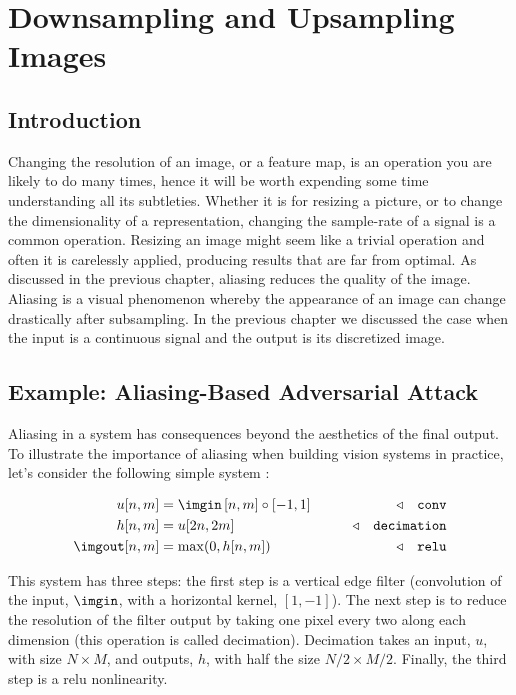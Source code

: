 \chapter{Downsampling and Upsampling Images}
\label{chap:downsampling_and_upsampling}

\newcommand{\imghidden}{\ell_{\texttt{hidden}}}


\section{Introduction}

Changing the resolution of an image, or a feature map, is an operation you are likely to do many times, hence it will be worth expending some time understanding all its subtleties. Whether it is for resizing a picture, or to change the dimensionality of a representation, changing the sample-rate of a signal is a common operation. Resizing an image might seem like a trivial operation and often it is carelessly applied, producing results that are far from optimal. As discussed in the previous chapter, aliasing reduces the quality of the image. Aliasing is a visual phenomenon whereby the appearance of an image can change drastically after subsampling. In the previous chapter we discussed the case when the input is a continuous signal and the output is its discretized image.  


\section{Example: Aliasing-Based Adversarial Attack}

Aliasing in a system has consequences beyond the aesthetics of the final output. To illustrate the importance of aliasing when building vision systems in practice, let's consider the following simple system \cite{rodríguezmuñoz2022aliasing}:

\begin{align}
    u[n,m] &= \imgin \left[n,m\right] \circ \left[-1, 1 \right]  & \quad\quad \triangleleft \quad \texttt{conv}\\
    h[n,m] &= u[2n,2m]  & \quad\quad \triangleleft \quad \texttt{decimation}\\
    \imgout[n,m] &= \max (0,h[n,m])  & \quad\quad \triangleleft \quad \texttt{relu}
\end{align}

This system has three steps: the first step is a vertical edge filter (convolution of the input, $\imgin$, with a horizontal kernel, $[1, -1]$). The next step is to reduce the resolution of the filter output by taking one pixel every two along each dimension (this operation is called decimation). Decimation takes an input, $u$, with size $N\times M$, and outputs, $h$, with half the size $N/2 \times M/2$.
Finally, the third step is a relu nonlinearity.

